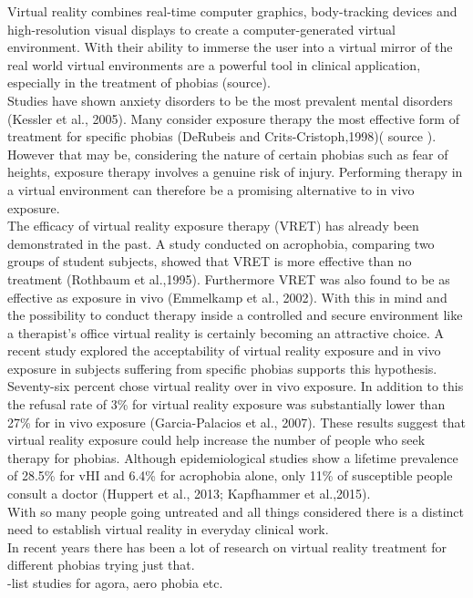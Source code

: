Virtual reality combines real-time computer graphics, body-tracking devices and high-resolution visual displays to create a computer-generated virtual environment. With their ability to immerse the user into a virtual mirror of the real world virtual environments are a powerful tool in clinical application, especially in the treatment of phobias (source). \\
Studies have shown anxiety disorders to be the most prevalent mental disorders (Kessler et al., 2005). Many consider exposure therapy the most effective form of treatment for specific phobias (DeRubeis and Crits-Cristoph,1998)( source ). However that may be, considering the nature of certain phobias such as fear of heights, exposure therapy involves a genuine risk of injury. Performing therapy in a virtual environment can therefore be a promising alternative to in vivo exposure.\\ 
The efficacy of virtual reality exposure therapy (VRET) has already been demonstrated in the past. A study conducted on acrophobia, comparing two groups of student subjects, showed that VRET is more effective than no treatment (Rothbaum et al.,1995). Furthermore VRET was also found to be as effective as exposure in vivo (Emmelkamp et al., 2002). With this in mind and the possibility to conduct therapy inside a controlled and secure environment like a therapist's office virtual reality is certainly becoming an attractive choice. A recent study explored the acceptability of virtual reality exposure and in vivo exposure in subjects suffering from specific phobias supports this hypothesis. Seventy-six percent chose virtual reality over in vivo exposure. In addition to this the refusal rate of 3\% for virtual reality exposure was substantially lower than 27\% for in vivo exposure (Garcia-Palacios et al., 2007). These results suggest that virtual reality exposure could help increase the number of people who seek therapy for phobias. Although epidemiological studies show a lifetime prevalence of 28.5\% for vHI and 6.4\% for acrophobia alone, only 11\% of susceptible people consult a doctor (Huppert et al., 2013; Kapfhammer et al.,2015).\\
With so many people going untreated and all things considered there is a distinct need to establish virtual reality in everyday clinical work.\\
In recent years there has been a lot of research on virtual reality treatment for different phobias trying just that.\\
-list studies for agora, aero phobia etc.\\

